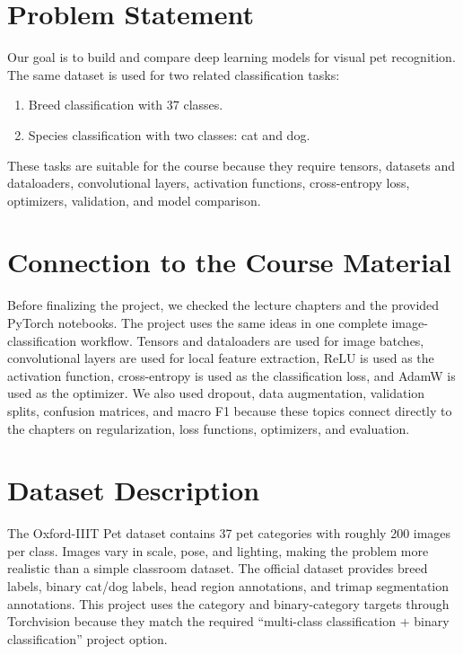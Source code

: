 \documentclass[11pt,a4paper]{article}
\begin{document}
\begin{abstract}
In this project, we worked on image classification with the Oxford-IIIT Pet dataset. The assignment asks for two tasks on the same dataset and a comparison between two model approaches. We solve 37-class breed classification and binary cat-versus-dog species classification. Model 1 is a convolutional neural network trained from scratch. Model 2 uses transfer learning with a pretrained ResNet18 backbone. We compare the models using accuracy, macro F1-score, training curves, confusion matrices, and the design choices from the course.
\end{abstract}

\section{Problem Statement}
Our goal is to build and compare deep learning models for visual pet recognition. The same dataset is used for two related classification tasks:
\begin{enumerate}[label=\arabic*.]
    \item Breed classification with 37 classes.
    \item Species classification with two classes: cat and dog.
\end{enumerate}
These tasks are suitable for the course because they require tensors, datasets and dataloaders, convolutional layers, activation functions, cross-entropy loss, optimizers, validation, and model comparison.

\section{Connection to the Course Material}
Before finalizing the project, we checked the lecture chapters and the provided PyTorch notebooks. The project uses the same ideas in one complete image-classification workflow. Tensors and dataloaders are used for image batches, convolutional layers are used for local feature extraction, ReLU is used as the activation function, cross-entropy is used as the classification loss, and AdamW is used as the optimizer. We also used dropout, data augmentation, validation splits, confusion matrices, and macro F1 because these topics connect directly to the chapters on regularization, loss functions, optimizers, and evaluation.

\section{Dataset Description}
The Oxford-IIIT Pet dataset contains 37 pet categories with roughly 200 images per class. Images vary in scale, pose, and lighting, making the problem more realistic than a simple classroom dataset. The official dataset provides breed labels, binary cat/dog labels, head region annotations, and trimap segmentation annotations. This project uses the category and binary-category targets through Torchvision because they match the required ``multi-class classification + binary classification'' project option.
\end{document}
